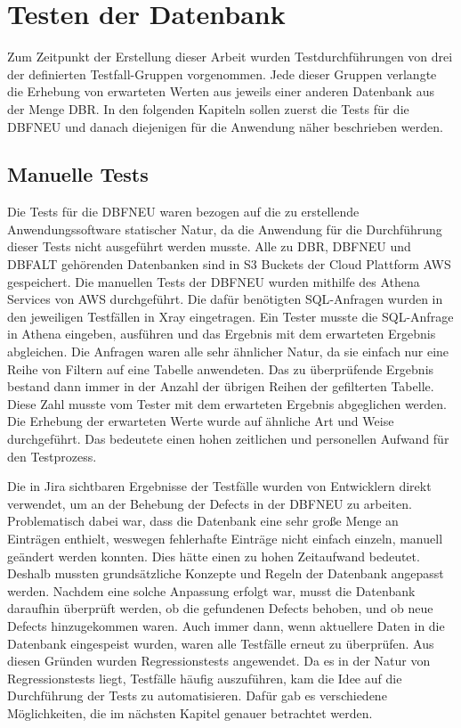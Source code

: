 \section{Testen der Datenbank}
Zum Zeitpunkt der Erstellung dieser Arbeit wurden Testdurchführungen von drei der definierten Testfall-Gruppen vorgenommen. Jede dieser Gruppen verlangte die Erhebung von erwarteten Werten aus jeweils einer anderen Datenbank aus der Menge \ac{DBR}. 
In den folgenden Kapiteln sollen zuerst die Tests für die \ac{DBFNEU} und danach diejenigen für die Anwendung näher beschrieben werden. 

\subsection{Manuelle Tests}
Die Tests für die \ac{DBFNEU} waren bezogen auf die zu erstellende Anwendungssoftware statischer Natur, da die Anwendung für die Durchführung dieser Tests nicht ausgeführt werden musste. 
\newline
Alle zu \ac{DBR}, \ac{DBFNEU} und \ac{DBFALT} gehörenden Datenbanken sind in \ac{S3} Buckets der Cloud Plattform \ac{AWS} gespeichert. Die manuellen Tests der \ac{DBFNEU} wurden mithilfe des Athena Services von \ac{AWS} durchgeführt. Die dafür benötigten \ac{SQL}-Anfragen wurden in den jeweiligen Testfällen in Xray eingetragen. Ein Tester musste die \ac{SQL}-Anfrage in Athena eingeben, ausführen und das Ergebnis mit dem erwarteten Ergebnis abgleichen.
\newline
Die Anfragen waren alle sehr ähnlicher Natur, da sie einfach nur eine Reihe von Filtern auf eine Tabelle anwendeten. Das zu überprüfende Ergebnis bestand dann immer in der Anzahl der übrigen Reihen der gefilterten Tabelle. Diese Zahl musste vom Tester mit dem erwarteten Ergebnis abgeglichen werden. Die Erhebung der erwarteten Werte wurde auf ähnliche Art und Weise durchgeführt. Das bedeutete einen hohen zeitlichen und personellen Aufwand für den Testprozess.
\newline


Die in Jira sichtbaren Ergebnisse der Testfälle wurden von Entwicklern direkt verwendet, um an der Behebung der Defects in der \ac{DBFNEU} zu arbeiten. Problematisch dabei war, dass die Datenbank eine sehr große Menge an Einträgen enthielt, weswegen fehlerhafte Einträge nicht einfach einzeln, manuell geändert werden konnten. Dies hätte einen zu hohen Zeitaufwand bedeutet. Deshalb mussten grundsätzliche Konzepte und Regeln der Datenbank angepasst werden. Nachdem eine solche Anpassung erfolgt war, musst die Datenbank daraufhin überprüft werden, ob die gefundenen Defects behoben, und ob neue Defects hinzugekommen waren. Auch immer dann, wenn aktuellere Daten in die Datenbank eingespeist wurden, waren alle Testfälle erneut zu überprüfen. Aus diesen Gründen wurden Regressionstests angewendet. 
Da es in der Natur von Regressionstests liegt, Testfälle häufig auszuführen, kam die Idee auf die Durchführung der Tests zu automatisieren. Dafür gab es verschiedene Möglichkeiten, die im nächsten Kapitel genauer betrachtet werden.


